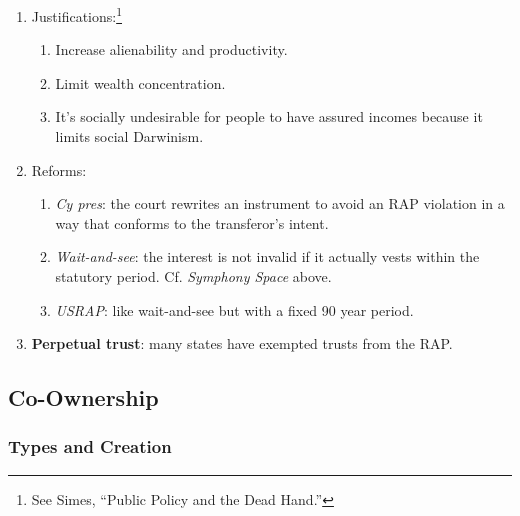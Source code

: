 \begin{enumerate}
\begin{enumerate}
\begin{enumerate}
            \item Justifications:\footnote{See Simes, ``Public Policy and the 
            Dead Hand.''}
            \begin{enumerate}
                \item Increase alienability and productivity.
                \item Limit wealth concentration.
                \item It's socially undesirable for people to have assured 
                incomes because it limits social Darwinism.
            \end{enumerate}
            \item Reforms:
            \begin{enumerate}
                \item \emph{Cy pres}: the court rewrites an instrument to 
                avoid an RAP violation in a way that conforms to the 
                transferor's intent.
                \item \emph{Wait-and-see}: the interest is not invalid if it 
                actually vests within the statutory period. Cf. \emph{Symphony 
                Space} above.
                \item \emph{USRAP}: like wait-and-see but with a fixed 90 year 
                period.
            \end{enumerate}
            \item \textbf{Perpetual trust}: many states have exempted trusts 
            from the RAP.
        \end{enumerate}
    \end{enumerate}
\end{enumerate}

\subsection{Co-Ownership}

\subsubsection{Types and Creation}

